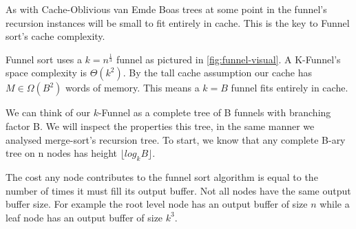 \documentclass[11pt, letterpaper]{article}
\begin{document}
As with Cache-Oblivious van Emde Boas trees at some point in the funnel's recursion instances will be small to fit entirely in cache.
This is the key to Funnel sort's cache complexity.

Funnel sort uses a $k = n^\frac{1}{3}$ funnel as pictured in \ref{fig:funnel-visual}.
A K-Funnel's space complexity is $\Theta(k^2)$. 
By the tall cache assumption our cache has $M \in \Omega(B^2)$ words of memory.
This means a $k = B$ funnel fits entirely in cache.

We can think of our $k$-Funnel as a complete tree of B funnels with branching factor B.
We will inspect the properties this tree, in the same manner we analysed merge-sort's recursion tree.
To start, we know that any complete B-ary tree on n nodes has height $\lfloor log_kB \rfloor$. 

The cost any node contributes to the funnel sort algorithm is equal to the number of times it must fill its output buffer.
Not all nodes have the same output buffer size. For example the root level node has an output buffer of size $n$ while a leaf node has an output buffer of size $k^3$. 
\end{document}

